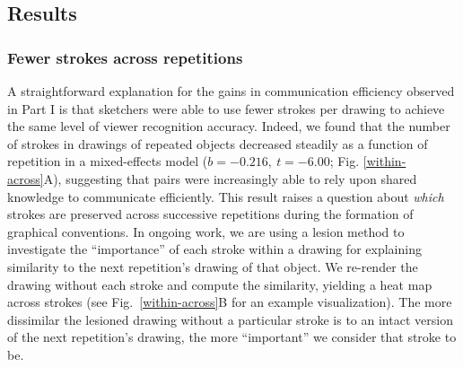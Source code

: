 \subsection{Results}
\subsubsection{Fewer strokes across repetitions}

A straightforward explanation for the gains in communication efficiency observed in Part I is that sketchers were able to use fewer strokes per drawing to achieve the same level of viewer recognition accuracy.
Indeed, we found that the number of strokes in drawings of repeated objects decreased steadily as a function of repetition in a mixed-effects model ($b = -0.216, ~t = -6.00$; Fig. \ref{within-across}A), %
suggesting that pairs were increasingly able to rely upon shared knowledge to communicate efficiently.
This result raises a question about \emph{which} strokes are preserved across successive repetitions during the formation of graphical conventions.
In ongoing work, we are using a lesion method to investigate the ``importance'' of each stroke within a drawing for explaining similarity to the next repetition's drawing of that object.
We re-render the drawing without each stroke and compute the similarity, yielding a heat map across strokes (see Fig.~\ref{within-across}B for an example visualization).
The more dissimilar the lesioned drawing without a particular stroke is to an intact version of the next repetition's drawing, the more ``important'' we consider that stroke to be.





